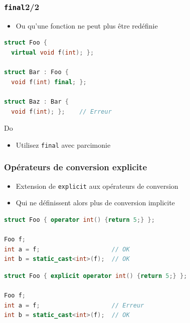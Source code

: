 \documentclass[C++.tex]{subfiles}
\begin{document}
\begin{frame}[fragile]
	\frametitle{\lstinline|final|\titlehfill{}2/2}
	\begin{itemize}
		\item Ou qu'une fonction ne peut plus être redéfinie
	\end{itemize}

	\begin{lstlisting}[language=C++]
struct Foo {
  virtual void f(int); };

struct Bar : Foo {
  void f(int) final; };

struct Baz : Bar {
  void f(int); };    // Erreur\end{lstlisting}

	\begin{exampleblock}{Do}
		\begin{itemize}
			\item Utilisez \lstinline|final| avec parcimonie
		\end{itemize}
	\end{exampleblock}
\end{frame}

\begin{frame}[fragile]
	\frametitle{Opérateurs de conversion explicite}
	\begin{itemize}
		\item Extension de \lstinline|explicit| aux opérateurs de conversion
		\item Qui ne définissent alors plus de conversion implicite
	\end{itemize}

	\begin{lstlisting}[language=C++]
struct Foo { operator int() {return 5;} };

Foo f;
int a = f;	                  // OK
int b = static_cast<int>(f);  // OK\end{lstlisting}

	\begin{lstlisting}[language=C++]
struct Foo { explicit operator int() {return 5;} };

Foo f;
int a = f;	                  // Erreur
int b = static_cast<int>(f);  // OK\end{lstlisting}
\end{frame}
\end{document}
